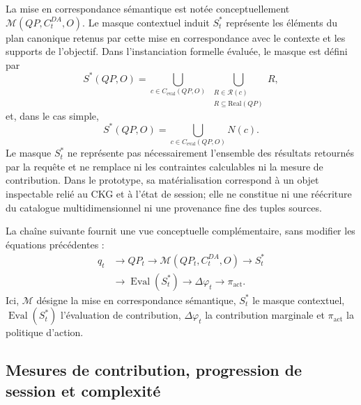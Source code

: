 \documentclass[journal]{IEEEtran}
\begin{document}
La mise en correspondance sémantique est notée conceptuellement $\mathcal{M}(QP,C_t^{DA},O)$. Le masque contextuel induit $S_t^*$ représente les éléments du plan canonique retenus par cette mise en correspondance avec le contexte et les supports de l'objectif. Dans l'instanciation formelle évaluée, le masque est défini par
\[
S^*(QP,O)=\bigcup_{c\in C_{\mathrm{eval}}(QP,O)} \ \bigcup_{\substack{R\in \mathcal{R}(c)\\R\subseteq \mathrm{Real}(QP)}} R,
\]
et, dans le cas simple,
\[
S^*(QP,O)=\bigcup_{c\in C_{\mathrm{eval}}(QP,O)} N(c).
\]
Le masque $S_t^*$ ne représente pas nécessairement l'ensemble des résultats retournés par la requête et ne remplace ni les contraintes calculables ni la mesure de contribution. Dans le prototype, sa matérialisation correspond à un objet inspectable relié au CKG et à l'état de session; elle ne constitue ni une réécriture du catalogue multidimensionnel ni une provenance fine des tuples sources.

La chaîne suivante fournit une vue conceptuelle complémentaire, sans modifier les équations précédentes :
\[
\begin{aligned}
q_t&\rightarrow QP_t\rightarrow \mathcal{M}(QP_t,C_t^{DA},O)\rightarrow S_t^*\\
   &\rightarrow \operatorname{Eval}(S_t^*)\rightarrow \Delta\varphi_t\rightarrow \pi_{\mathrm{act}}.
\end{aligned}
\]
Ici, $\mathcal{M}$ désigne la mise en correspondance sémantique, $S_t^*$ le masque contextuel, $\operatorname{Eval}(S_t^*)$ l'évaluation de contribution, $\Delta\varphi_t$ la contribution marginale et $\pi_{\mathrm{act}}$ la politique d'action.

\subsection{Mesures de contribution, progression de session et complexité}
\end{document}
